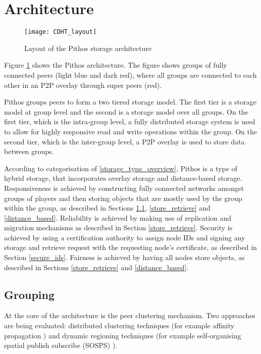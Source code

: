 \section{Architecture}

\begin{figure}[htbp]
 \centering
 \texttt{[image: CDHT\_layout]}
 \caption{Layout of the Pithos storage architecture}
 \label{fig_pithos}
\end{figure}
%
Figure \ref{fig_pithos} shows the Pithos architecture. The figure shows groups of fully connected peers (light blue and dark red), where all groups
are connected to each other in an P2P overlay through super peers (red).

Pithos groups peers to form a two tiered storage model. The first tier is a storage model at group level and the second is a storage model over all
groups. On the first tier, which is the intra-group level, a fully distributed storage system is used to allow for highly responsive read and write operations within the group. On the second tier, which is the inter-group level, a P2P overlay is used to store data between groups.

According to categorisation of \ref{storage_type_overview}, Pithos is a type of hybrid storage, that incorporates overlay storage and distance-based
storage. Responsiveness is achieved by constructing fully connected networks amongst groups of players and then storing objects that are mostly used
by the group within the group, as described in Sections \ref{grouping}, \ref{store_retrieve} and \ref{distance_based}. Reliability is achieved by
making use of replication and migration mechanisms as described in Section \ref{store_retrieve}. Security is achieved by using a certification
authority to assign node IDs and signing any storage and retrieve request with the requesting node's certificate, as described in Section
\ref{secure_ids}. Fairness is achieved by having all nodes store objects, as described in Sections \ref{store_retrieve} and \ref{distance_based}.

\subsection{Grouping}
\label{grouping}

At the core of the architecture is the peer clustering mechanism. Two approaches are being evaluated: distributed clustering techniques (for example
affinity propagation \cite{affinity_propagation}) and dynamic regioning techniques (for example self-organising spatial publish subscribe (SOSPS)
\cite{self_organising_sps_post}).

